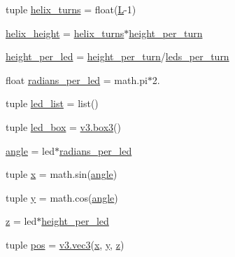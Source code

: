 \begin{DoxyCompactItemize}
\item 
tuple \hyperlink{namespacecalc__lamp_a16e8ac2cfa1d3f1b02d7699fb1f0e5d0}{helix\+\_\+turns} = float(\hyperlink{namespacecalc__lamp_a61c0b95cbaf24598117340c745f06cb5}{L}-\/1)
\item 
\hyperlink{namespacecalc__lamp_ab2143c5488cff230353890b72615d7b4}{helix\+\_\+height} = \hyperlink{namespacecalc__lamp_a16e8ac2cfa1d3f1b02d7699fb1f0e5d0}{helix\+\_\+turns}$\ast$\hyperlink{namespacecalc__lamp_aae862acf48d47d29de10038c66c88186}{height\+\_\+per\+\_\+turn}
\item 
\hyperlink{namespacecalc__lamp_a99c3d189f142019bc22c5e7bdda8ddaf}{height\+\_\+per\+\_\+led} = \hyperlink{namespacecalc__lamp_aae862acf48d47d29de10038c66c88186}{height\+\_\+per\+\_\+turn}/\hyperlink{namespacecalc__lamp_aa3ded2a7a642f31bc04b9a2390e87f2c}{leds\+\_\+per\+\_\+turn}
\item 
float \hyperlink{namespacecalc__lamp_a293f8c6e4a3571865e0d87bdaeb52aec}{radians\+\_\+per\+\_\+led} = math.\+pi$\ast$2.
\item 
tuple \hyperlink{namespacecalc__lamp_af715266869242410b2fe465651871054}{led\+\_\+list} = list()
\item 
tuple \hyperlink{namespacecalc__lamp_a6988f889f4e66771a6f9370d1b8bc9b1}{led\+\_\+box} = \hyperlink{classv3_1_1box3}{v3.\+box3}()
\item 
\hyperlink{namespacecalc__lamp_a82aeed2e966856f51d4f4f92b77e2ec6}{angle} = led$\ast$\hyperlink{namespacecalc__lamp_a293f8c6e4a3571865e0d87bdaeb52aec}{radians\+\_\+per\+\_\+led}
\item 
tuple \hyperlink{namespacecalc__lamp_aa8ac454a435aa87a128701d48e86b265}{x} = math.\+sin(\hyperlink{namespacecalc__lamp_a82aeed2e966856f51d4f4f92b77e2ec6}{angle})
\item 
tuple \hyperlink{namespacecalc__lamp_ace4756a004516f85bd3e10ec64c6f56e}{y} = math.\+cos(\hyperlink{namespacecalc__lamp_a82aeed2e966856f51d4f4f92b77e2ec6}{angle})
\item 
\hyperlink{namespacecalc__lamp_a3b8d6def1fba2f531a1c3cb590dd0bc7}{z} = led$\ast$\hyperlink{namespacecalc__lamp_a99c3d189f142019bc22c5e7bdda8ddaf}{height\+\_\+per\+\_\+led}
\item 
tuple \hyperlink{namespacecalc__lamp_a7cb8bc15da13759da2aa07dc77cf13fe}{pos} = \hyperlink{classv3_1_1vec3}{v3.\+vec3}(\hyperlink{namespacecalc__lamp_aa8ac454a435aa87a128701d48e86b265}{x}, \hyperlink{namespacecalc__lamp_ace4756a004516f85bd3e10ec64c6f56e}{y}, \hyperlink{namespacecalc__lamp_a3b8d6def1fba2f531a1c3cb590dd0bc7}{z})
\end{DoxyCompactItemize}


